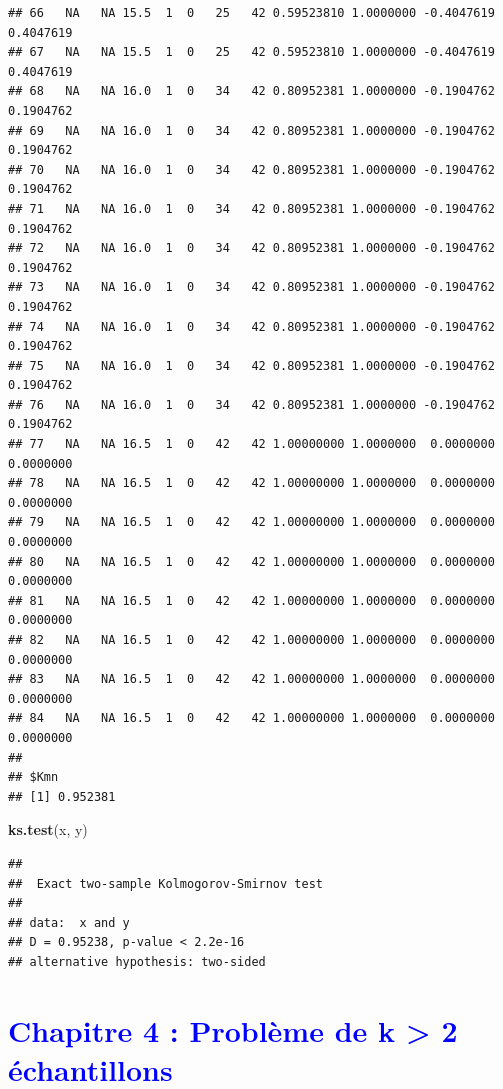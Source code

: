 \documentclass[
  12pt,
]{article}
\newenvironment{Shaded}{\begin{snugshade}}{\end{snugshade}}
\newcommand{\FunctionTok}[1]{\textcolor[rgb]{0.13,0.29,0.53}{\textbf{#1}}}
\newcommand{\NormalTok}[1]{#1}
\begin{document}
\begin{verbatim}
## 66   NA   NA 15.5  1  0   25   42 0.59523810 1.0000000 -0.4047619 0.4047619
## 67   NA   NA 15.5  1  0   25   42 0.59523810 1.0000000 -0.4047619 0.4047619
## 68   NA   NA 16.0  1  0   34   42 0.80952381 1.0000000 -0.1904762 0.1904762
## 69   NA   NA 16.0  1  0   34   42 0.80952381 1.0000000 -0.1904762 0.1904762
## 70   NA   NA 16.0  1  0   34   42 0.80952381 1.0000000 -0.1904762 0.1904762
## 71   NA   NA 16.0  1  0   34   42 0.80952381 1.0000000 -0.1904762 0.1904762
## 72   NA   NA 16.0  1  0   34   42 0.80952381 1.0000000 -0.1904762 0.1904762
## 73   NA   NA 16.0  1  0   34   42 0.80952381 1.0000000 -0.1904762 0.1904762
## 74   NA   NA 16.0  1  0   34   42 0.80952381 1.0000000 -0.1904762 0.1904762
## 75   NA   NA 16.0  1  0   34   42 0.80952381 1.0000000 -0.1904762 0.1904762
## 76   NA   NA 16.0  1  0   34   42 0.80952381 1.0000000 -0.1904762 0.1904762
## 77   NA   NA 16.5  1  0   42   42 1.00000000 1.0000000  0.0000000 0.0000000
## 78   NA   NA 16.5  1  0   42   42 1.00000000 1.0000000  0.0000000 0.0000000
## 79   NA   NA 16.5  1  0   42   42 1.00000000 1.0000000  0.0000000 0.0000000
## 80   NA   NA 16.5  1  0   42   42 1.00000000 1.0000000  0.0000000 0.0000000
## 81   NA   NA 16.5  1  0   42   42 1.00000000 1.0000000  0.0000000 0.0000000
## 82   NA   NA 16.5  1  0   42   42 1.00000000 1.0000000  0.0000000 0.0000000
## 83   NA   NA 16.5  1  0   42   42 1.00000000 1.0000000  0.0000000 0.0000000
## 84   NA   NA 16.5  1  0   42   42 1.00000000 1.0000000  0.0000000 0.0000000
## 
## $Kmn
## [1] 0.952381
\end{verbatim}

\begin{Shaded}
\begin{Highlighting}[]
\FunctionTok{ks.test}\NormalTok{(x, y)}
\end{Highlighting}
\end{Shaded}

\begin{verbatim}
## 
##  Exact two-sample Kolmogorov-Smirnov test
## 
## data:  x and y
## D = 0.95238, p-value < 2.2e-16
## alternative hypothesis: two-sided
\end{verbatim}

 


\newpage

\section{\texorpdfstring{\textcolor{blue}{Chapitre 4 : Problème de k > 2 échantillons}}{}}\label{section-3}
\end{document}
